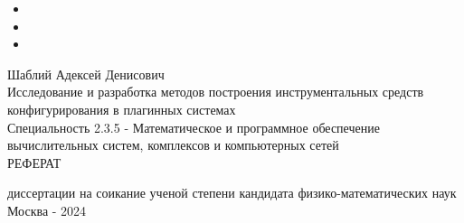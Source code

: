 \begin{itemize}
    \item[]
    \item[]
    \item[]
\end{itemize}
\begin{center}
Шаблий Адексей Денисович
\\[4\baselineskip]
Исследование и разработка методов построения инструментальных 
средств конфигурирования в плагинных системах
\\[4\baselineskip]
Специальность 2.3.5 - Математическое и программное обеспечение вычислительных систем, комплексов и компьютерных сетей
\\[4\baselineskip]
РЕФЕРАТ

диссертации на соикание ученой степени кандидата физико-математических наук
\\[4\baselineskip]
Москва - 2024
\end{center}
